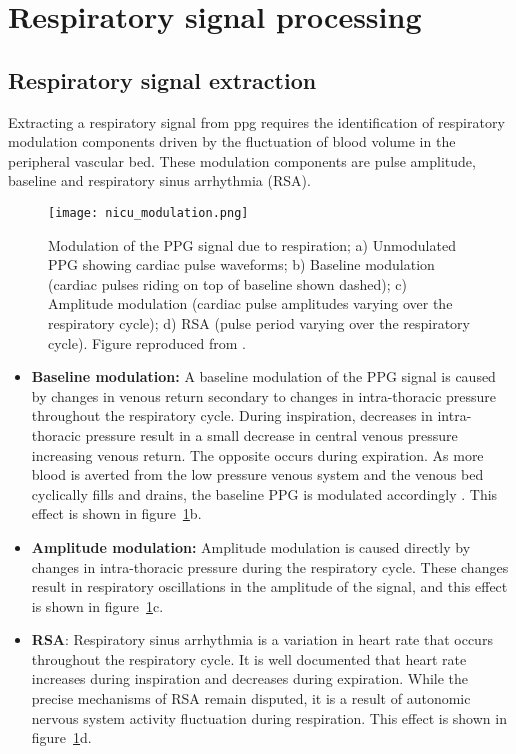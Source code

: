 \section{Respiratory signal processing}

\subsection{Respiratory signal extraction }

Extracting a respiratory signal from \gls{ppg} requires the identification of respiratory modulation components driven by the fluctuation of blood volume in the peripheral vascular bed. These modulation components are pulse amplitude, baseline and respiratory sinus arrhythmia (RSA).

\begin{figure}
  \centering
    \texttt{[image: nicu\_modulation.png]}
    \caption[Modulation of the PPG signal due to respiration.]
    {
    Modulation of the PPG signal due to respiration; a) Unmodulated PPG showing cardiac pulse waveforms; b) Baseline modulation (cardiac pulses riding on top of baseline shown dashed); c) Amplitude modulation (cardiac pulse amplitudes varying over the respiratory cycle); d) RSA (pulse period varying over the respiratory cycle). Figure reproduced from \cite{addison2012developing}.
    }
	\label{modulation)}
\end{figure}

\begin{itemize}

	\item \textbf{Baseline modulation:} A baseline modulation of the PPG signal is caused by changes in venous return secondary to changes in intra-thoracic pressure throughout the respiratory cycle. During inspiration, decreases in intra-thoracic pressure result in a small decrease in central venous pressure increasing venous return. The opposite occurs during expiration. As more blood is averted from the low pressure venous system and the venous bed cyclically fills and drains, the baseline PPG is modulated accordingly \cite{addison2012developing}. This effect is shown in figure~\ref{modulation)}b.
	
	\item \textbf{Amplitude modulation:} Amplitude modulation is caused directly by changes in intra-thoracic pressure during the respiratory cycle. These changes result in respiratory oscillations in the amplitude of the signal, and this effect is shown in figure~\ref{modulation)}c.
	
	\item \textbf{RSA}: Respiratory sinus arrhythmia is a variation in heart rate that occurs throughout the respiratory cycle. It is well documented that heart rate increases during inspiration and decreases during expiration. While the precise mechanisms of RSA remain disputed, it is a result of autonomic nervous system activity fluctuation during respiration. This effect is shown in figure~\ref{modulation)}d.

\end{itemize}

